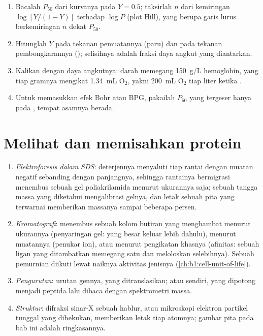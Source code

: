 \begin{method}\label{met:b1:proteins:hill}
\begin{enumerate}
  \item Bacalah $P_{50}$ dari kurvanya pada $Y = 0.5$; taksirlah $n$
        dari kemiringan $\log[Y/(1-Y)]$ terhadap $\log P$ (plot Hill),
        yang berupa garis lurus berkemiringan $n$ dekat $P_{50}$.
  \item Hitunglah $Y$ pada tekanan pemuatannya (paru) dan pada tekanan
        pembongkarannya (); selisihnya adalah fraksi daya
        angkut yang diantarkan.
  \item Kalikan dengan daya angkutnya: darah memegang \qty{150}{g/L}
        hemoglobin, yang tiap gramnya mengikat \qty{1.34}{mL}
        $\mathrm{O_2}$, yakni \qty{200}{mL} $\mathrm{O_2}$ tiap liter
        ketika .
  \item Untuk memasukkan efek Bohr atau BPG, pakailah $P_{50}$ yang
        tergeser hanya pada , tempat asamnya berada.
\end{enumerate}
\end{method}

\section{Melihat dan memisahkan protein}

\begin{method}\label{met:b1:proteins:methods}
\begin{enumerate}
  \item \emph{Elektroforesis dalam SDS}: deterjennya menyaluti tiap
        rantai dengan muatan negatif sebanding dengan panjangnya,
        sehingga rantainya bermigrasi menembus sebuah gel poliakrilamida
        menurut ukurannya saja; sebuah tangga massa yang diketahui
        mengalibrasi gelnya, dan letak sebuah pita yang terwarnai
        memberikan massanya sampai beberapa persen.
  \item \emph{Kromatografi}: menembus sebuah kolom butiran yang
        menghambat  menurut ukurannya (penyaringan gel: yang
        besar keluar lebih dahulu), menurut muatannya (penukar ion),
        atau menurut pengikatan khasnya (afinitas: sebuah ligan yang
        ditambatkan memegang satu  dan meloloskan selebihnya).
        Sebuah pemurnian diikuti lewat naiknya aktivitas jenisnya
        (\cref{ch:b1:cell-unit-of-life}).
  \item \emph{Pengurutan}: urutan gennya, yang ditranslasikan; atau
         sendiri, yang dipotong menjadi peptida lalu dibaca
        dengan spektrometri massa.
  \item \emph{Struktur}: difraksi sinar-X sebuah hablur, atau
        mikroskopi elektron partikel tunggal yang dibekukan, memberikan
        letak tiap atomnya; gambar pita pada bab ini adalah
        ringkasannya.
\end{enumerate}
\end{method}

